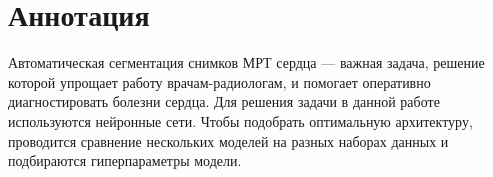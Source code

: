 \section{Аннотация}

Автоматическая сегментация снимков МРТ сердца — важная задача, решение которой упрощает работу врачам-радиологам, и помогает оперативно диагностировать болезни сердца. Для решения задачи в данной работе используются нейронные сети. Чтобы подобрать оптимальную архитектуру, проводится сравнение нескольких моделей на разных наборах данных и подбираются гиперпараметры модели.
